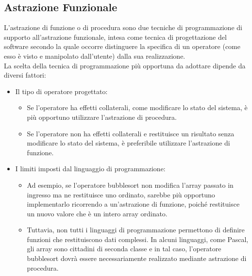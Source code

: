 \documentclass{article}
\begin{document}
	

	\subsection{Astrazione Funzionale}
	L'astrazione di funzione o di procedura sono due tecniche di programmazione di supporto all'astrazione funzionale, intesa come tecnica di progettazione del software secondo la quale occorre distinguere la specifica di un operatore (come esso è visto e manipolato dall'utente) dalla sua realizzazione.
	\vspace{\baselineskip} \\
	La scelta della tecnica di programmazione più opportuna da adottare dipende da diversi fattori:
	\begin{itemize}
		\item Il tipo di operatore progettato:
		\begin{itemize}
			\item Se l'operatore ha effetti collaterali, come modificare lo stato del sistema, è più opportuno utilizzare l'astrazione di procedura.
			\item Se l'operatore non ha effetti collaterali e restituisce un risultato senza modificare lo stato del sistema, è preferibile utilizzare l'astrazione di funzione.
		\end{itemize}
		\item I limiti imposti dal linguaggio di programmazione:
		\begin{itemize}
			\item Ad esempio, se l'operatore bubblesort non modifica l'array passato in ingresso ma ne restituisce uno ordinato, sarebbe più opportuno implementarlo ricorrendo a un'astrazione di funzione, poiché restituisce un nuovo valore che è un intero array ordinato.
			\item Tuttavia, non tutti i linguaggi di programmazione permettono di definire funzioni che restituiscono dati complessi. In alcuni linguaggi, come Pascal, gli array sono cittadini di seconda classe e in tal caso, l'operatore bubblesort dovrà essere necessariamente realizzato mediante astrazione di procedura.
		\end{itemize}
	\end{itemize}
\end{document}
